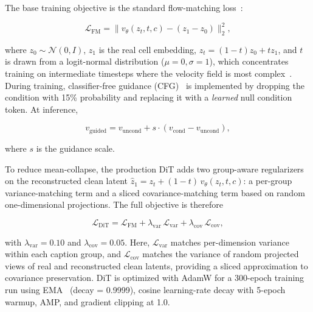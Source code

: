 \documentclass[11pt,a4paper]{article}
\begin{document}
The base training objective is the standard flow-matching loss~\cite{ref-flow-matching,ref-ot-cfm}:

\begin{linenomath}
\begin{equation}
\mathcal{L}_\text{FM} = \| v_\theta(z_t, t, c) - (z_1 - z_0) \|_2^2,
\label{eq:fm}
\end{equation}
\end{linenomath}

where $z_0 \sim \mathcal{N}(0, I)$, $z_1$ is the real cell embedding, $z_t = (1-t)z_0 + tz_1$, and $t$ is drawn from a logit-normal distribution ($\mu{=}0, \sigma{=}1$), which concentrates training on intermediate timesteps where the velocity field is most complex~\cite{ref-sd3}. During training, classifier-free guidance (CFG)~\cite{ref-cfg} is implemented by dropping the condition with 15\% probability and replacing it with a \emph{learned} null condition token. At inference,

\begin{linenomath}
\begin{equation}
v_\text{guided} = v_\text{uncond} + s \cdot (v_\text{cond} - v_\text{uncond}),
\label{eq:cfg}
\end{equation}
\end{linenomath}

where $s$ is the guidance scale.

To reduce mean-collapse, the production DiT adds two group-aware regularizers on the reconstructed clean latent $\hat{z}_1 = z_t + (1-t)\,v_\theta(z_t,t,c)$: a per-group variance-matching term and a sliced covariance-matching term based on random one-dimensional projections. The full objective is therefore

\begin{linenomath}
\begin{equation}
\mathcal{L}_\text{DiT} = \mathcal{L}_\text{FM} + \lambda_\text{var}\,\mathcal{L}_\text{var} + \lambda_\text{cov}\,\mathcal{L}_\text{cov},
\label{eq:var-loss}
\end{equation}
\end{linenomath}

with $\lambda_\text{var}=0.10$ and $\lambda_\text{cov}=0.05$. Here, $\mathcal{L}_\text{var}$ matches per-dimension variance within each caption group, and $\mathcal{L}_\text{cov}$ matches the variance of random projected views of real and reconstructed clean latents, providing a sliced approximation to covariance preservation. DiT is optimized with AdamW for a 300-epoch training run using EMA~\cite{ref-ema} (decay = 0.9999), cosine learning-rate decay with 5-epoch warmup, AMP, and gradient clipping at 1.0.
\end{document}
